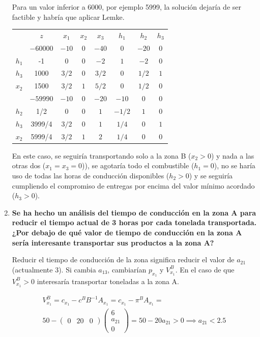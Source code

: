 \begin{enumerate}
    Para un valor inferior a 6000, por ejemplo 5999, la solución dejaría de ser factible y habría que aplicar Lemke.

    \begin{center}
    \begin{tabular}{c|c|cccccc|}
     & $z$ & $x_1$ & $x_2$ & $x_3$ & $h_1$ & $h_2$ & $h_3$\\ 
     & $-60000$ & $-10$ & $0$ & $-40$ & $0$ & $-20$ & $0$ \\ 
    \hline
    $h_1$ & -1  & $0$ & $0$ & $-2$ & $1$ & $-2$ & $0$\\ 
    $h_3$ & 1000  & $3/2$ & $0$ & $3/2$ & $0$ & $1/2$ & $1$\\ 
    $x_2$ & 1500  & $3/2$ & $1$ & $5/2$ & $0$ & $1/2$ & $0$\\ 
    \hline
       & $-59990$ & $-10$ & $0$ & $-20$ & $-10$ & $0$ & $0$ \\ 
    \hline
    $h_2$ & 1/2  & $0$ & $0$ & $1$ & $-1/2$ & $1$ & $0$\\ 
    $h_3$ & 3999/4  & $3/2$ & $0$ & $1$ & $1/4$ & $0$ & $1$\\ 
    $x_2$ & 5999/4  & $3/2$ & $1$ & $2$ & $1/4$ & $0$ & $0$\\ 
    \hline
    \end{tabular}
    \end{center}

    En este caso, se seguiría transportando solo a la zona B ($x_2>0$) y nada a las otras dos ($x_1=x_3=0$)), se agotaría todo el combustible ($h_1=0$), no se haría uso de todas las horas de conducción disponibles ($h_2>0$) y se seguiría cumpliendo el compromiso de entregas por encima del valor mínimo acordado ($h_3>0$).    
    
    
    \item \textbf{Se ha hecho un análisis del tiempo de conducción en la zona A para reducir el tiempo actual de 3 horas por cada tonelada transportada. ¿Por debajo de qué valor de tiempo de conducción en la zona A sería interesante transportar sus productos a la zona A?}

    Reducir el tiempo de conducción de la zona significa reducir el valor de $a_{21}$ (actualmente 3). Si cambia $a_{13}$, cambiarían $p_{x_1}$ y $V^B_{x_1}$. En el caso de que $V^B_{x_1} >0$ interesaría transportar toneladas a la zona A.

    \begin{equation}
    \begin{split}
    V^B_{x_1}=c_{x_1}-c^BB^{-1}A_{x_1}=c_{x_1}-\pi^BA_{x_1} = \\
    50 - \begin{pmatrix}
        0 & 20 & 0
    \end{pmatrix}
    \begin{pmatrix}
        6 \\
        a_{21} \\
        0
    \end{pmatrix} = 50 - 20a_{21} > 0 \implies a_{21} < 2.5
    \end{split}
    \end{equation}


\end{enumerate}
